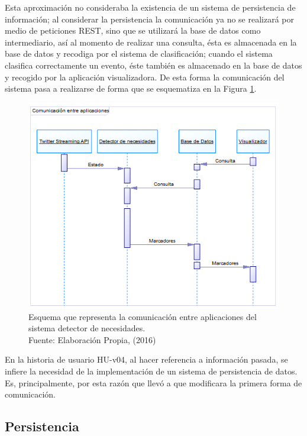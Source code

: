Esta aproximación no consideraba la existencia de un sistema de persistencia de información; al considerar la persistencia la comunicación ya no se realizará por medio de peticiones REST, sino que se utilizará la base de datos como intermediario, así al momento de realizar una consulta, ésta es almacenada en la base de datos y recodiga por el sistema de clasificación; cuando el sistema clasifica correctamente un evento, éste también es almacenado en la base de datos y recogido por la aplicación visualizadora. De esta forma la comunicación del sistema pasa a realizarse de forma que se esquematiza en la Figura \ref{fig:comunFinal}.

\begin{figure}[H]
	\centering
	\captionsetup{justification=centering}
	\includegraphics[scale=0.8]{images/ComunicacionFinal.png}
	\caption[Esquema que representa la comunicación entre aplicaciones del sistema detector de necesidades.]{Esquema que representa la comunicación entre aplicaciones del sistema detector de necesidades.\\Fuente: Elaboración Propia, (2016)}
	\label{fig:comunFinal}
\end{figure}

En la historia de usuario HU-v04, al hacer referencia a información pasada, se infiere la necesidad de la implementación de un sistema de persistencia de datos. Es, principalmente, por esta razón que llevó a que modificara la primera forma de comunicación.

\subsection{Persistencia}
\label{sec:diseno:persistencia}

